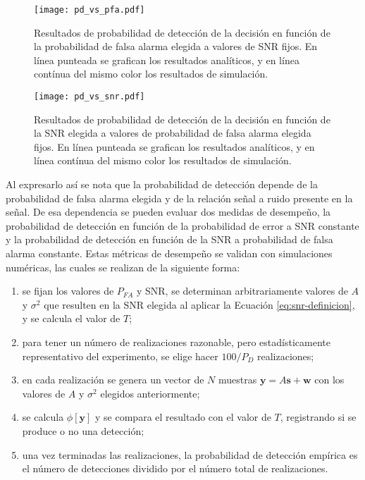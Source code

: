 \begin{figure}[t]
    \centering{}\texttt{[image: pd\_vs\_pfa.pdf]}
    \caption{Resultados de probabilidad de detección de la decisión en función de la probabilidad de falsa alarma elegida a valores de SNR fijos. En línea punteada se grafican los resultados analíticos, y en línea contínua del mismo color los resultados de simulación.\label{fig:pd-vs-pfa}}
\end{figure}
\begin{figure}[t]
    \centering{}\texttt{[image: pd\_vs\_snr.pdf]}
    \caption{Resultados de probabilidad de detección de la decisión en función de la SNR elegida a valores de probabilidad de falsa alarma elegida fijos. En línea punteada se grafican los resultados analíticos, y en línea contínua del mismo color los resultados de simulación.\label{fig:pd-vs-snr}}  
\end{figure}


Al expresarlo así se nota que la probabilidad de detección depende de la probabilidad de falsa alarma elegida y de la relación señal a ruido presente en la señal. De esa dependencia se pueden evaluar dos medidas de desempeño, la probabilidad de detección en función de la probabilidad de error a SNR constante y la probabilidad de detección en función de la SNR a probabilidad de falsa alarma constante. Estas métricas de desempeño se validan con simulaciones numéricas, las cuales se realizan de la siguiente forma:
\begin{enumerate}
    \item se fijan los valores de $P_{FA}$ y SNR, se determinan arbitrariamente valores de $A$ y $\sigma^2$ que resulten en la SNR elegida al aplicar la Ecuación \ref{eq:snr-definicion}, y se calcula el valor de $T$;
    \item para tener un número de realizaciones razonable, pero estadísticamente representativo del experimento, se elige hacer $100/P_D$ realizaciones;
    \item en cada realización se genera un vector de $N$ muestras $\mathbf{y} = A\mathbf{s}+\mathbf{w}$ con los valores de $A$ y $\sigma^2$ elegidos anteriormente;
    \item se calcula $\phi[\mathbf{y}]$ y se compara el resultado con el valor de $T$, registrando si se produce o no una detección;
    \item una vez terminadas las realizaciones, la probabilidad de detección empírica es el número de detecciones dividido por el número total de realizaciones.
\end{enumerate}


